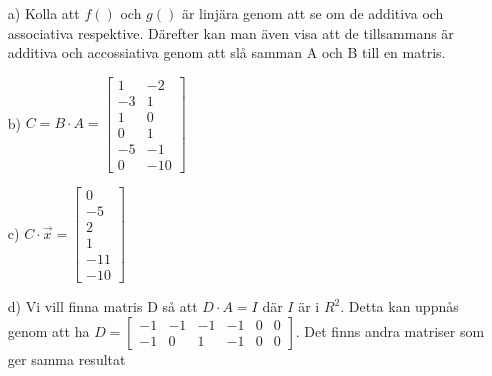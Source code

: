 \begin{itemize}
	\item[a) ] Kolla att $f()$ och $g()$ är linjära genom att se om de additiva och associativa respektive. Därefter kan man även visa att de tillsammans är additiva och accossiativa genom att slå samman A och B till en matris.
	\item[b) ] $C=B\cdot A=\begin{bmatrix}1&-2\\-3&1\\1&0\\0&1\\-5&-1\\0&-10\end{bmatrix}  $
	\item[c) ] $C\cdot \vec{x}=\begin{bmatrix}0\\-5\\2\\1\\-11\\-10\end{bmatrix}$
	\item[d) ] Vi vill finna matris D så att $D\cdot A=I$ där $I$ är i $R^2$. Detta kan uppnås genom att ha $D=\begin{bmatrix}-1&-1&-1&-1&0&0\\-1&0&1&-1&0&0\end{bmatrix}$. Det finns andra matriser som ger samma resultat
\end{itemize}

